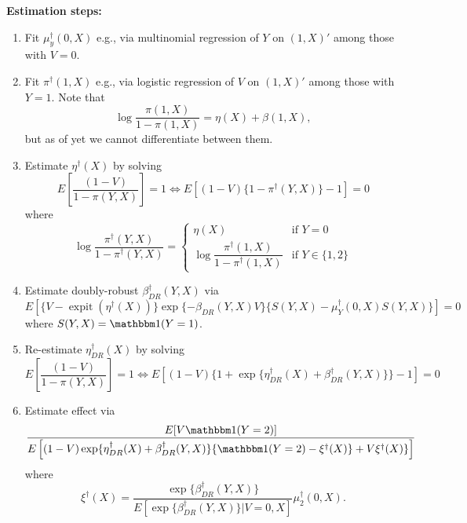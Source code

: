 \documentclass[12pt]{article}
\begin{document}
\textbf{Estimation steps:}
\begin{enumerate}
    \item Fit $\mu_y^\dagger(0,X)$ e.g., via multinomial regression of $Y$ on $(1,X)'$ among those with $V= 0$.
    \item Fit $\pi^\dagger(1,X)$ e.g., via logistic regression of $V$ on $(1,X)'$ among those with $Y=1$. Note that 
    \[\log \dfrac{\pi(1,X)}{1-\pi(1,X)} = \eta(X) + \beta(1, X),\]
    but as of yet we cannot differentiate between them.
    \item Estimate $\eta^\dagger(X)$ by solving 
    \[E\left[\dfrac{(1-V)}{1 -\pi(Y,X)}\right] = 1 \iff E[(1-V)\{1 - \pi^\dagger(Y,X)\} - 1] = 0\]
    where 
    \[\log \dfrac{\pi^\dagger(Y,X)}{1 - \pi^\dagger(Y,X)} = \begin{cases} \eta(X) & \text{if } Y = 0 \\
    \log \dfrac{\pi^\dagger(1,X)}{1-\pi^\dagger(1,X)}  & \text{if } Y \in \{1,2\}
    \end{cases}\]
    \item Estimate doubly-robust $\beta_{DR}^\dagger(Y,X)$ via 
    \[E\left[\{V - \operatorname{expit}(\eta^\dagger(X))\}\exp\{-\beta_{DR}(Y,X)V\}\{S(Y,X) - \mu_Y^\dagger(0, X)S(Y,X)\}\right] = 0\]
    where $S(Y,X) = \mathbbm 1 (Y = 1)$.
    \item Re-estimate $\eta_{DR}^\dagger(X)$ by solving 
    \[E\left[\dfrac{(1-V)}{1 -\pi(Y,X)}\right] = 1 \iff E[(1-V)\{1 + \exp\{\eta_{DR}^\dagger(X) + \beta^\dagger_{DR}(Y,X)\}\} - 1] = 0\]
    \item Estimate effect via
    \[\dfrac{E[V \mathbbm 1(Y =2)]}{ E\left[(1 - V) \exp\{\eta_{DR}^\dagger(X) + \beta^\dagger_{DR}(Y,X)\}\{\mathbbm 1(Y = 2) - \xi^\dagger(X)\} + V\xi^\dagger(X)\}  \right]}\]
    where
    \[\xi^\dagger(X)= \dfrac{\exp\{\beta^\dagger_{DR}(Y,X)\}}{E[\exp\{\beta^\dagger_{DR}(Y,X)\}|V=0,X ]}\mu_2^\dagger(0,X).\]
\end{enumerate}
\newpage
\end{document}
